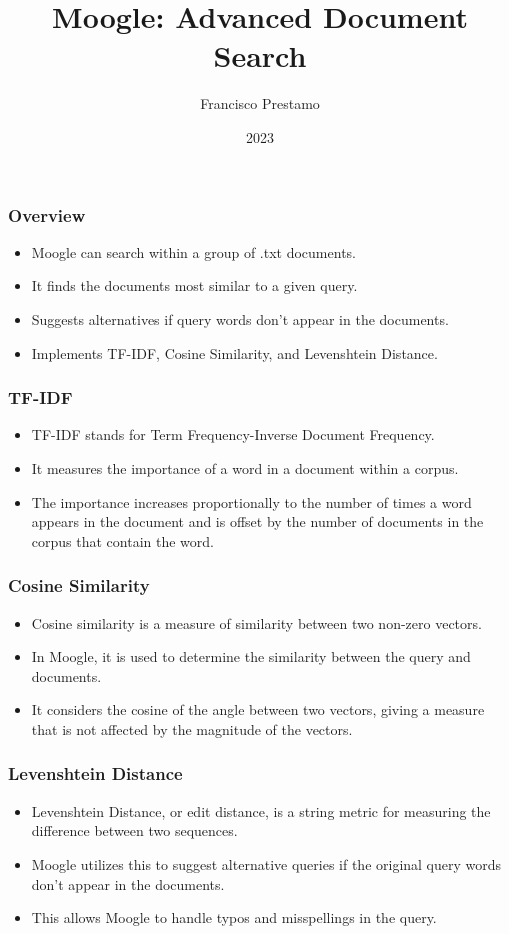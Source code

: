 \documentclass{beamer}
\title{Moogle: Advanced Document Search}
\author{Francisco Prestamo}
\date{2023}
\begin{document}
\frame{\titlepage}

\begin{frame}
\frametitle{Overview}
\begin{itemize}
\item Moogle can search within a group of .txt documents.
\item It finds the documents most similar to a given query.
\item Suggests alternatives if query words don't appear in the documents.
\item Implements TF-IDF, Cosine Similarity, and Levenshtein Distance.
\end{itemize}
\end{frame}

\begin{frame}
\frametitle{TF-IDF}
\begin{itemize}
\item TF-IDF stands for Term Frequency-Inverse Document Frequency.
\item It measures the importance of a word in a document within a corpus.
\item The importance increases proportionally to the number of times a word appears in the document and is offset by the number of documents in the corpus that contain the word.
\end{itemize}
\end{frame}

\begin{frame}
\frametitle{Cosine Similarity}
\begin{itemize}
\item Cosine similarity is a measure of similarity between two non-zero vectors.
\item In Moogle, it is used to determine the similarity between the query and documents.
\item It considers the cosine of the angle between two vectors, giving a measure that is not affected by the magnitude of the vectors.
\end{itemize}
\end{frame}

\begin{frame}
\frametitle{Levenshtein Distance}
\begin{itemize}
\item Levenshtein Distance, or edit distance, is a string metric for measuring the difference between two sequences.
\item Moogle utilizes this to suggest alternative queries if the original query words don't appear in the documents.
\item This allows Moogle to handle typos and misspellings in the query.
\end{itemize}
\end{frame}
\end{document}
